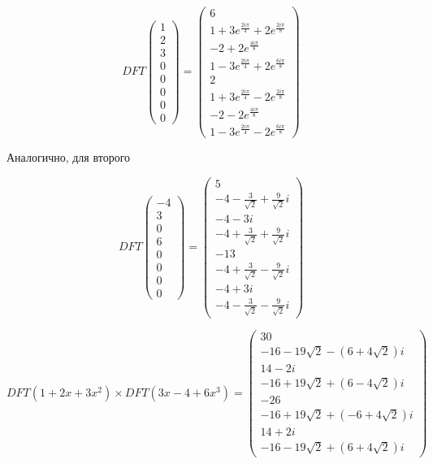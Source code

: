 \documentclass[a4paper, 11pt]{article} %
\begin{document}
\begin{enumerate}
\[DFT
\begin{pmatrix}
1 \\ 2 \\ 3 \\ 0 \\ 0 \\ 0 \\ 0 \\ 0
\end{pmatrix} = 
\begin{pmatrix}
6\\ 1 + 3e^{\frac{2i\pi}{4}} + 2e^{\frac{2i\pi}{8}} \\ -2 + 2e^{\frac{4i\pi}{8}}  \\ 1 - 3e^{\frac{2i\pi}{4}} +2e^{\frac{6i\pi}{8}}   \\ 2 \\ 1 + 3e^{\frac{2i\pi}{4}} -  2e^{\frac{2i\pi}{8}}  \\ -2  - 2e^{\frac{4i\pi}{8}} \\ 1 - 3e^{\frac{2i\pi}{4}}  - 2e^{\frac{6i\pi}{8}}
\end{pmatrix}
\]

Аналогично, для второго 

\[DFT
\begin{pmatrix}
-4 \\ 3 \\ 0 \\ 6 \\ 0 \\ 0 \\ 0 \\ 0
\end{pmatrix} = 
\begin{pmatrix}
5\\ -4 -\frac{3}{\sqrt{2}} + \frac{9}{\sqrt{2}}i\\ -4 -3i  \\-4+\frac{3}{\sqrt{2}} + \frac{9}{\sqrt{2}}i  \\ -13 \\-4+\frac{3}{\sqrt{2}} - \frac{9}{\sqrt{2}}i   \\ -4  + 3i \\ -4 -\frac{3}{\sqrt{2}} - \frac{9}{\sqrt{2}}i
\end{pmatrix}
\]

\[
DFT(1+2x+3x^2) \times DFT(3x-4+6x^3) = 
\begin{pmatrix}
30\\-16-19\sqrt{2} -(6+4\sqrt{2})i \\ 14 -2i\\ -16+19\sqrt{2} +(6-4\sqrt{2})i\\-26 \\-16+19\sqrt{2} +(-6+4\sqrt{2})i\\14 + 2i\\-16-19\sqrt{2} +(6+4\sqrt{2})i
\end{pmatrix}
\]


\end{enumerate}
\end{document}
